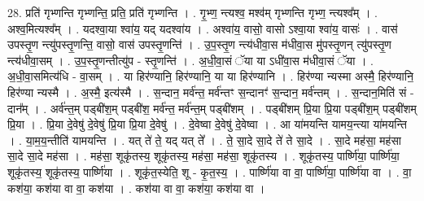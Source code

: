 \documentclass[17pt]{extarticle}
\begin{document}
28. प्रति॑ गृभ्णन्ति गृभ्णन्ति॒ प्रति॒ प्रति॑ गृभ्णन्ति । . गृ॒भ्ण॒ न्त्यश्व॒ मश्व॑म् गृभ्णन्ति गृभ्ण॒ न्त्यश्व᳚म् । . अश्व॒मित्यश्व᳚म् । . यदश्वा॒या श्वा॑य॒ यद् यदश्वा॑य । . अश्वा॑य॒ वासो॒ वासो ऽश्वा॒या श्वा॑य॒ वासः॑ । . वास॑ उपस्तृ॒ण न्त्यु॑पस्तृ॒णन्ति॒ वासो॒ वास॑ उपस्तृ॒णन्ति॑ । . उ॒प॒स्तृ॒ण न्त्य॑धीवा॒स म॑धीवा॒स मु॑पस्तृ॒णन् त्यु॑पस्तृ॒ण न्त्य॑धीवा॒सम् । . उ॒प॒स्तृ॒णन्तीत्यु॑प - स्तृ॒णन्ति॑ । . अ॒धी॒वा॒सं ॅया या ऽधी॑वा॒स म॑धीवा॒सं ॅया । . अ॒धी॒वा॒समित्य॑धि - वा॒सम् । . या हिर॑ण्यानि॒ हिर॑ण्यानि॒ या या हिर॑ण्यानि । . हिर॑ण्या न्यस्मा अस्मै॒ हिर॑ण्यानि॒ हिर॑ण्या न्यस्मै । . अ॒स्मै॒ इत्य॑स्मै । . स॒न्दान॒ मर्व॑न्त॒ मर्व॑न्तꣳ स॒न्दानꣳ॑ स॒न्दान॒ मर्व॑न्तम् । . स॒न्दान॒मिति॑ सं - दान᳚म् । . अर्व॑न्त॒म् पड्बी॑श॒म् पड्बी॑श॒ मर्व॑न्त॒ मर्व॑न्त॒म् पड्बी॑शम् । . पड्बी॑शम् प्रि॒या प्रि॒या पड्बी॑श॒म् पड्बी॑शम् प्रि॒या । . प्रि॒या दे॒वेषु॑ दे॒वेषु॑ प्रि॒या प्रि॒या दे॒वेषु॑ । . दे॒वेष्वा दे॒वेषु॑ दे॒वेष्वा । . आ या॑मयन्ति यामय॒न्त्या या॑मयन्ति । . या॒म॒य॒न्तीति॑ यामयन्ति । . यत् ते॑ ते॒ यद् यत् ते᳚ । . ते॒ सा॒दे सा॒दे ते॑ ते सा॒दे । . सा॒दे मह॑सा॒ मह॑सा सा॒दे सा॒दे मह॑सा । . मह॑सा॒ शूकृ॑तस्य॒ शूकृ॑तस्य॒ मह॑सा॒ मह॑सा॒ शूकृ॑तस्य । . शूकृ॑तस्य॒ पार्ष्णि॑या॒ पार्ष्णि॑या॒ शूकृ॑तस्य॒ शूकृ॑तस्य॒ पार्ष्णि॑या । . शूकृ॑त॒स्येति॒ शू - कृ॒त॒स्य॒ । . पार्ष्णि॑या वा वा॒ पार्ष्णि॑या॒ पार्ष्णि॑या वा । . वा॒ कश॑या॒ कश॑या वा वा॒ कश॑या । . कश॑या वा वा॒ कश॑या॒ कश॑या वा । \newline
\end{document}
